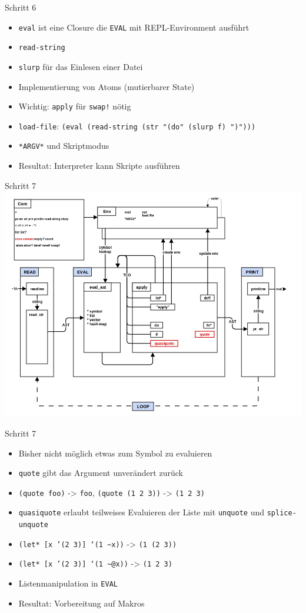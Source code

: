 \documentclass[presentation]{beamer}
\begin{document}
\begin{frame}[fragile,label=sec-3-19]{Schritt 6}
 \begin{itemize}
\item \texttt{eval} ist eine Closure die \texttt{EVAL} mit REPL-Environment ausführt
\item \texttt{read-string}
\item \texttt{slurp} für das Einlesen einer Datei
\item Implementierung von Atoms (mutierbarer State)
\item Wichtig: \texttt{apply} für \texttt{swap!} nötig
\item \texttt{load-file}: \texttt{(eval (read-string (str "(do" (slurp f) ")")))}
\item \texttt{*ARGV*} und Skriptmodus
\item Resultat: Interpreter kann Skripte ausführen
\end{itemize}
\end{frame}

\begin{frame}[label=sec-3-20]{Schritt 7}
\includegraphics[width=.9\linewidth]{./images/step7_quote.png}
\end{frame}

\begin{frame}[fragile,label=sec-3-21]{Schritt 7}
 \begin{itemize}
\item Bisher nicht möglich etwas zum Symbol zu evaluieren
\item \texttt{quote} gibt das Argument unverändert zurück
\item \texttt{(quote foo)} -> \texttt{foo}, \texttt{(quote (1 2 3))} -> \texttt{(1 2 3)}
\item \texttt{quasiquote} erlaubt teilweises Evaluieren der Liste mit \texttt{unquote}
  und \texttt{splice-unquote}
\item \texttt{(let* [x '(2 3)] `(1 \textasciitilde{}x))} -> \texttt{(1 (2 3))}
\item \texttt{(let* [x '(2 3)] `(1 \textasciitilde{}@x))} -> \texttt{(1 2 3)}
\item Listenmanipulation in \texttt{EVAL}
\item Resultat: Vorbereitung auf Makros
\end{itemize}
\end{frame}
\end{document}
